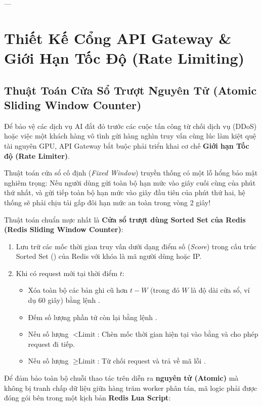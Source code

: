 ---

\section{Thiết Kế Cổng API Gateway \& Giới Hạn Tốc Độ (Rate Limiting)}
\label{sec:fastapi-ratelimiting}

\subsection{Thuật Toán Cửa Sổ Trượt Nguyên Tử (Atomic Sliding Window Counter)}
Để bảo vệ các dịch vụ AI đắt đỏ trước các cuộc tấn công từ chối dịch vụ (DDoS) hoặc việc một khách hàng vô tình gửi hàng nghìn truy vấn cùng lúc làm kiệt quệ tài nguyên GPU, API Gateway bắt buộc phải triển khai cơ chế \textbf{Giới hạn Tốc độ (Rate Limiter)}.

Thuật toán cửa sổ cố định (\textit{Fixed Window}) truyền thống có một lỗ hổng bảo mật nghiêm trọng: Nếu người dùng gửi toàn bộ hạn mức vào giây cuối cùng của phút thứ nhất, và gửi tiếp toàn bộ hạn mức vào giây đầu tiên của phút thứ hai, hệ thống sẽ phải chịu tải gấp đôi hạn mức an toàn trong vòng 2 giây!

Thuật toán chuẩn mực nhất là \textbf{Cửa sổ trượt dùng Sorted Set của Redis (Redis Sliding Window Counter)}:
\begin{enumerate}
  \item Lưu trữ các mốc thời gian truy vấn dưới dạng điểm số (\textit{Score}) trong cấu trúc Sorted Set () của Redis với khóa là mã người dùng hoặc IP.
  \item Khi có request mới tại thời điểm $t$:
    \begin{itemize}
      \item Xóa toàn bộ các bản ghi cũ hơn $t - W$ (trong đó $W$ là độ dài cửa sổ, ví dụ 60 giây) bằng lệnh .
      \item Đếm số lượng phần tử còn lại bằng lệnh .
      \item Nếu số lượng $< \text{Limit}$: Chèn mốc thời gian hiện tại vào bằng  và cho phép request đi tiếp.
      \item Nếu số lượng $\ge \text{Limit}$: Từ chối request và trả về mã lỗi .
    \end{itemize}
\end{enumerate}

Để đảm bảo toàn bộ chuỗi thao tác trên diễn ra \textbf{nguyên tử (Atomic)} mà không bị tranh chấp dữ liệu giữa hàng trăm worker phân tán, mã logic phải được đóng gói bên trong một kịch bản \textbf{Redis Lua Script}:

